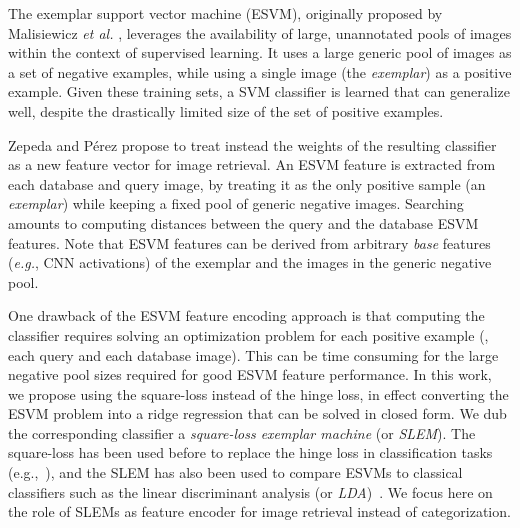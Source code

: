 The exemplar support vector machine (ESVM), originally proposed by Malisiewicz {\it et al.} \cite{Malisiewicza}, leverages the availability of large, unannotated pools of images within the context of supervised learning. It uses a large generic pool of images as a set of negative examples, while using a single image (the \emph{exemplar}) as a positive example. Given these training sets, a SVM classifier is learned that can generalize well, despite the drastically limited size of the set of positive examples.

Zepeda and P\'erez \cite{ZePe15} propose to treat instead the weights of the resulting classifier as a new feature vector for image retrieval. %
An ESVM feature is extracted from each database and query image, by treating it as the only positive sample (an \emph{exemplar}) while keeping a fixed pool of generic negative images. Searching amounts to computing distances between the query and the database ESVM features. Note that ESVM features can be derived from arbitrary \emph{base} features ({\it e.g.}, CNN activations) of the exemplar and the images in the generic negative pool. %


One drawback of the ESVM feature encoding approach is that computing the  classifier requires solving an optimization problem for each positive example (\ie, each query and each database image). This can be time consuming for the large negative pool sizes required for good ESVM feature performance. In this work, we propose using the square-loss instead of the hinge loss, in effect converting the ESVM problem into a ridge regression that can be solved in closed form. 
We dub the corresponding classifier a {\em square-loss exemplar machine} (or {\em SLEM}). The square-loss has been used before to replace the hinge loss in classification tasks (e.g.,~\cite{lssvm,YeXi07}), and the SLEM has also been used to compare ESVMs to classical classifiers such as the linear discriminant analysis (or {\em LDA})~\cite{Koba15}. We focus here on the role of SLEMs as feature encoder for image retrieval instead of categorization.

